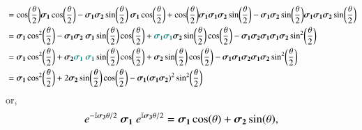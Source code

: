 \begin{align*} 
                                                 &=   \cos(\frac{\theta}{2}) \vec{\sigma_1} \cos(\frac{\theta}{2}) 
                                                  - \vec{\sigma_1} \vec{\sigma_2} \sin(\frac{\theta}{2})  \ \vec{\sigma_1} \cos(\frac{\theta}{2})
                                                  + \cos(\frac{\theta}{2}) \vec{\sigma_1}  \vec{\sigma_1} \vec{\sigma_2} \sin(\frac{\theta}{2}) 
                                                  -  \vec  {\sigma_1} \vec{\sigma_2} \sin(\frac{\theta}{2}) \vec{\sigma_1}  \vec{\sigma_1} \vec{\sigma_2} \sin(\frac{\theta}{2}) \\
                                                 &=  \vec{\sigma_1}   \cos[2](\frac{\theta}{2}) 
                                                  - \vec{\sigma_1} \vec{\sigma_2}  \ \vec{\sigma_1} \sin(\frac{\theta}{2})  \cos(\frac{\theta}{2}) 
                                                  + \color{teal} \vec{\sigma_1}  \vec{\sigma_1}  \color{black} \vec{\sigma_2} \sin(\frac{\theta}{2})  \cos(\frac{\theta}{2})
                                                  -  \vec  {\sigma_1} \vec{\sigma_2} \vec{\sigma_1} \vec{\sigma_1} \vec{\sigma_2}    \sin[2](\frac{\theta}{2}) \\
                                                 &=  \vec{\sigma_1}   \cos[2](\frac{\theta}{2}) 
                                                  + \vec{\sigma_2} \color{teal} \vec{\sigma_1}  \ \vec{\sigma_1} \color{black} \sin(\frac{\theta}{2})  \cos(\frac{\theta}{2})
                                                  + \vec{\sigma_2} \sin(\frac{\theta}{2})  \cos(\frac{\theta}{2})
                                                  -  \vec  {\sigma_1} \vec{\sigma_1} \vec{\sigma_2} \vec{\sigma_1} \vec{\sigma_2}    \sin[2](\frac{\theta}{2}) \\
                                                 &=  \vec{\sigma_1}   \cos[2](\frac{\theta}{2}) 
                                                 + 2 \vec{\sigma_2} \sin(\frac{\theta}{2})  \cos(\frac{\theta}{2})
                                                 - \vec{\sigma_1}  (\vec  {\sigma_1} \vec{\sigma_2} )^2    \sin[2](\frac{\theta}{2})
\end{align*}
or,
\begin{equation} \label{eq:sigma_x_rotated}
     \large \exp{ -\mathbb{I} \vec{\sigma_3} \theta / 2} \ \vec{\sigma_1}  \
     \exp{ \mathbb{I} \vec{\sigma_3} \theta / 2} =  \vec{\sigma_1} \cos(\theta) + \vec{\sigma_2} \sin(\theta),
\end{equation}
